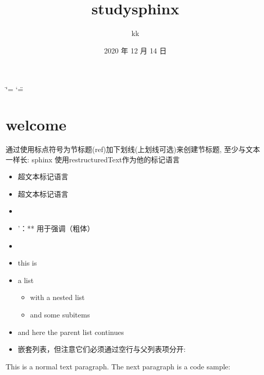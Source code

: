 \documentclass[letterpaper,10pt,english]{sphinxmanual}
\title{study\sphinxhyphen{}sphinx}
\date{2020 年 12 月 14 日}
\author{kk}
\begin{document}
\ifdefined\shorthandoff
  \ifnum\catcode`\=\string=\active\shorthandoff{=}\fi
  \ifnum\catcode`\"=\active{}\fi
\fi

\pagestyle{empty}
\sphinxmaketitle
\pagestyle{plain}
\sphinxtableofcontents
\pagestyle{normal}
\label{\detokenize{index::doc}}



\chapter{welcome}
\label{\detokenize{welcome:welcome}}\label{\detokenize{welcome::doc}}
通过使用标点符号为节标题(ref)加下划线(上划线可选)来创建节标题, 至少与文本一样长:
sphinx 使用restructuredText作为他的标记语言
\begin{itemize}
\item {} 
 超文本标记语言

\item {} 
 超文本标记语言

\item {} 
 

\item {} 
’：** 用于强调（粗体）

\item {} 

\end{itemize}
\begin{itemize}
\item {} 
this is

\item {} 
a list
\begin{itemize}
\item {} 
with a nested list

\item {} 
and some subitems

\end{itemize}

\item {} 
and here the parent list continues

\item {} 
嵌套列表，但注意它们必须通过空行与父列表项分开:

\end{itemize}

This is a normal text paragraph. The next paragraph is a code sample:
\end{document}
